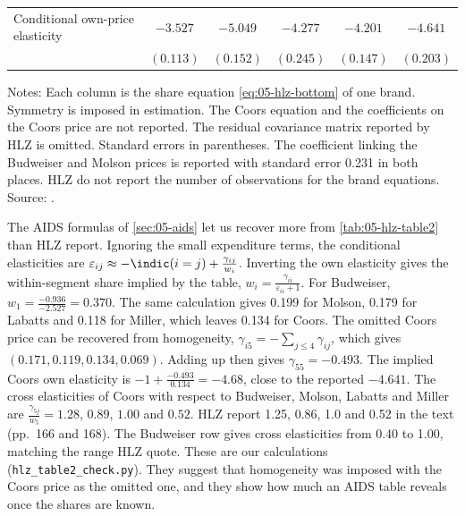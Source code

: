 \begin{table}[htbp]
\begin{threeparttable}
\begin{tabular}{@{}lccccc@{}}
\midrule
Conditional own-price elasticity & $-3.527$ & $-5.049$ & $-4.277$ & $-4.201$ & $-4.641$ \\
 & $(0.113)$ & $(0.152)$ & $(0.245)$ & $(0.147)$ & $(0.203)$ \\
\bottomrule
\end{tabular}
\begin{tablenotes}[flushleft]\footnotesize
\item Notes: Each column is the share equation \eqref{eq:05-hlz-bottom} of one brand. Symmetry is imposed in
estimation. The Coors equation and the coefficients on the Coors price are not reported. The residual covariance
matrix reported by HLZ is omitted. Standard errors in parentheses. The coefficient linking the Budweiser and Molson
prices is reported with standard error 0.231 in both places. HLZ do not report the number of observations for
the brand equations. Source: \citet[Table 2]{HausmanLeonardZona1994}.
\end{tablenotes}
\end{threeparttable}
\end{table}

\begin{example}\label{ex:05-hlz-reading}
The AIDS formulas of \cref{sec:05-aids} let us recover more from \cref{tab:05-hlz-table2} than HLZ report.
Ignoring the small expenditure terms, the conditional elasticities are
$\varepsilon_{ij} \approx -\indic(i = j) + \frac{\gamma_{ij}}{w_i}$. Inverting the own elasticity gives the
within-segment share implied by the table, $w_i = \frac{\gamma_{ii}}{\varepsilon_{ii} + 1}$. For Budweiser,
$w_1 = \frac{-0.936}{-2.527} = 0.370$. The same calculation gives 0.199 for Molson, 0.179 for Labatts and 0.118 for
Miller, which leaves 0.134 for Coors. The omitted Coors price can be recovered from homogeneity,
$\gamma_{i5} = -\sum_{j\le 4}\gamma_{ij}$, which gives $(0.171, 0.119, 0.134, 0.069)$. Adding up then gives
$\gamma_{55} = -0.493$. The implied Coors own elasticity is $-1 + \frac{-0.493}{0.134} = -4.68$, close to the
reported $-4.641$. The cross elasticities of Coors with respect to Budweiser, Molson, Labatts and Miller are
$\frac{\gamma_{5j}}{w_5} = 1.28$, $0.89$, $1.00$ and $0.52$. HLZ report 1.25, 0.86, 1.0 and 0.52 in the text
(pp.~166 and 168). The Budweiser row gives cross elasticities from 0.40 to 1.00, matching the range HLZ quote.
These are our calculations (\texttt{hlz\_table2\_check.py}). They suggest that homogeneity was imposed with the
Coors price as the omitted one, and they show how much an AIDS table reveals once the shares are known.
\end{example}

